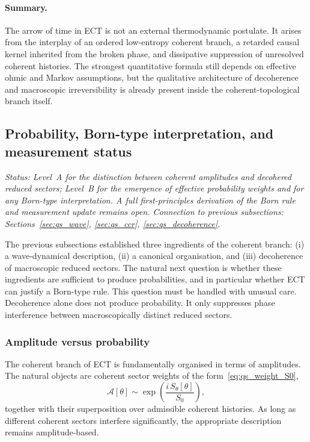 \paragraph{Summary.}
The arrow of time in ECT is not an external thermodynamic postulate.
It arises from the interplay of an ordered low-entropy coherent branch,
a retarded causal kernel inherited from the broken phase, and
dissipative suppression of unresolved coherent histories.
The strongest quantitative formula still depends on effective ohmic and
Markov assumptions, but the qualitative architecture of decoherence and
macroscopic irreversibility is already present inside the
coherent-topological branch itself.

\subsection{Probability, Born-type interpretation, and measurement status}
\label{sec:qs_born}

\textit{Status: Level~A for the distinction between coherent amplitudes
and decohered reduced sectors; Level~B for the emergence of effective
probability weights and for any Born-type interpretation.
A full first-principles derivation of the Born rule and measurement
update remains open.
Connection to previous subsections:
Sections~\ref{sec:qs_wave}, \ref{sec:qs_ccr},
\ref{sec:qs_decoherence}.}

\medskip
The previous subsections established three ingredients of the coherent
branch: (i) a wave-dynamical description, (ii) a canonical
organisation, and (iii) decoherence of macroscopic reduced sectors.
The natural next question is whether these ingredients are sufficient
to produce probabilities, and in particular whether ECT can justify a
Born-type rule.
This question must be handled with unusual care.
Decoherence alone does not produce probability.
It only suppresses phase interference between macroscopically distinct
reduced sectors.

\subsubsection*{Amplitude versus probability}

The coherent branch of ECT is fundamentally organised in terms of
amplitudes.
The natural objects are coherent sector weights of the
form~\eqref{eq:qs_weight_S0},
\[
  \mathcal{A}[\theta]
  \sim
  \exp\!\left(\frac{i\,S_\theta[\theta]}{S_0}\right),
\]
together with their superposition over admissible coherent histories.
As long as different coherent sectors interfere significantly, the
appropriate description remains amplitude-based.


